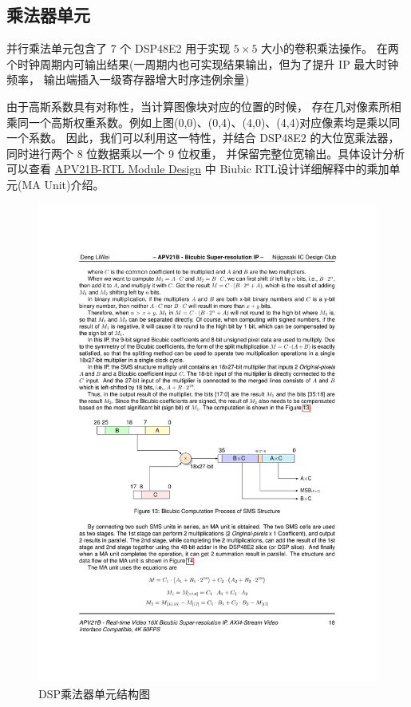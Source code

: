 \documentclass[12pt, a4paper, oneside]{ctexbook}
\begin{document}
	\subsection{乘法器单元} \label{mul_unit}
	并行乘法单元包含了 7 个 DSP48E2 用于实现 $5\times5$ 大小的卷积乘法操作。
	在两个时钟周期内可输出结果(一周期内也可实现结果输出，但为了提升 IP 最大时钟频率，
	输出端插入一级寄存器增大时序违例余量)\par 由于高斯系数具有对称性，当计算图像块对应的位置的时候，
	存在几对像素所相乘同一个高斯权重系数。例如上图(0,0)、(0,4)、(4,0)、(4,4)对应像素均是乘以同一个系数。
	因此，我们可以利用这一特性，并结合 DSP48E2 的大位宽乘法器，同时进行两个 8 位数据乘以一个 9 位权重，
	并保留完整位宽输出。具体设计分析可以查看 \href{./ref/APV21B_RTL_Module_Design.pdf}{APV21B-RTL Module Design} 中 Biubic RTL设计详细解释中的乘加单元(MA Unit)介绍。%
		\begin{figure}[h]
			\centering
			\includegraphics[scale=1]{pic/mul_unit}
			\caption{DSP乘法器单元结构图}
			\label{fig:mulunit}
		\end{figure}
\end{document}
